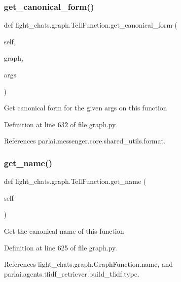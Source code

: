 \subsubsection{\texorpdfstring{get\+\_\+canonical\+\_\+form()}{get\_canonical\_form()}}
{\footnotesize\ttfamily def light\+\_\+chats.\+graph.\+Tell\+Function.\+get\+\_\+canonical\+\_\+form (\begin{DoxyParamCaption}\item[{}]{self,  }\item[{}]{graph,  }\item[{}]{args }\end{DoxyParamCaption})}

\begin{DoxyVerb}Get canonical form for the given args on this function\end{DoxyVerb}
 

Definition at line 632 of file graph.\+py.



References parlai.\+messenger.\+core.\+shared\+\_\+utils.\+format.

\mbox{\label{classlight__chats_1_1graph_1_1TellFunction_a39a099e864d0d20f997c03d96d7e1df8}} 
\subsubsection{\texorpdfstring{get\+\_\+name()}{get\_name()}}
{\footnotesize\ttfamily def light\+\_\+chats.\+graph.\+Tell\+Function.\+get\+\_\+name (\begin{DoxyParamCaption}\item[{}]{self }\end{DoxyParamCaption})}

\begin{DoxyVerb}Get the canonical name of this function\end{DoxyVerb}
 

Definition at line 625 of file graph.\+py.



References light\+\_\+chats.\+graph.\+Graph\+Function.\+name, and parlai.\+agents.\+tfidf\+\_\+retriever.\+build\+\_\+tfidf.\+type.

